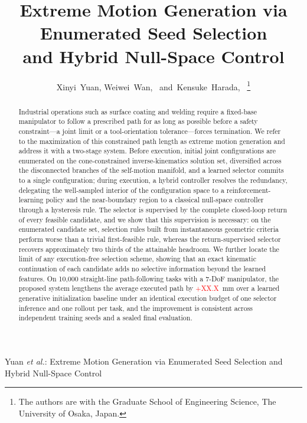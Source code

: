 \documentclass[journal]{IEEEtran}
\newcommand{\ph}[1]{\textcolor{red}{#1}}          %
\newcommand{\nSealed}{10{,}000}
\newcommand{\phDeltaSealed}{\ph{$+$XX.X}}    %
\begin{document}
\title{Extreme Motion Generation via Enumerated Seed Selection\\
and Hybrid Null-Space Control}

\author{Xinyi~Yuan,
        Weiwei~Wan,~
        and~Kensuke~Harada,~%
\thanks{The authors are with the Graduate School of Engineering Science,
The University of Osaka, Japan.}}

%
{Yuan \MakeLowercase{\textit{et al.}}: Extreme Motion Generation via
Enumerated Seed Selection and Hybrid Null-Space Control}

\maketitle

\begin{abstract}
Industrial operations such as surface coating and welding require a
fixed-base manipulator to follow a prescribed path for as long as possible
before a safety constraint---a joint limit or a tool-orientation
tolerance---forces termination. We refer to the maximization of this
constrained path length as extreme motion generation and address it with a
two-stage system. Before execution, initial joint configurations are
enumerated on the cone-constrained inverse-kinematics solution set,
diversified across the disconnected branches of the self-motion manifold,
and a learned selector commits to a single configuration; during execution,
a hybrid controller resolves the redundancy, delegating the well-sampled
interior of the configuration space to a reinforcement-learning policy and
the near-boundary region to a classical null-space controller through a
hysteresis rule. The selector is supervised by the complete closed-loop
return of every feasible candidate, and we show that this supervision is
necessary: on the enumerated candidate set, selection rules built from
instantaneous geometric criteria perform worse than a trivial
first-feasible rule, whereas the return-supervised selector recovers
approximately two thirds of the attainable headroom. We further locate the
limit of any execution-free selection scheme, showing that an exact
kinematic continuation of each candidate adds no selective information
beyond the learned features. On \nSealed{} straight-line path-following
tasks with a 7-DoF manipulator, the proposed system lengthens the average
executed path by \phDeltaSealed~mm over a learned generative initialization
baseline under an identical execution budget of one selector inference and
one rollout per task, and the improvement is consistent across independent
training seeds and a sealed final evaluation.
\end{abstract}
\end{document}
